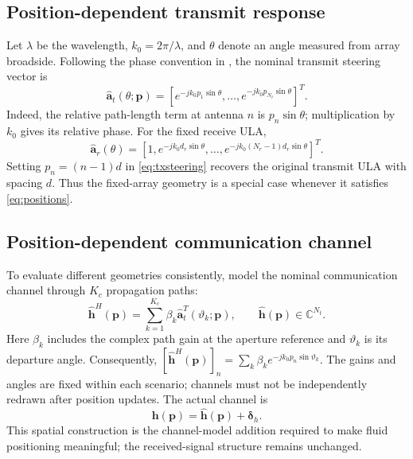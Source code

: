 \documentclass[11pt]{article}
\newcommand{\pos}{\mathbf p}
\begin{document}
\subsection{Position-dependent transmit response}
Let $\lambda$ be the wavelength, $k_0=2\pi/\lambda$, and $\theta$ denote an
angle measured from array broadside. Following the phase convention in
\cite{wang2026}, the nominal transmit steering vector is
\begin{equation}
 \widehat{\mathbf a}_t(\theta;\pos)
 =\left[e^{-jk_0p_1\sin\theta},\ldots,
 e^{-jk_0p_{N_t}\sin\theta}\right]^T.
 \label{eq:txsteering}
\end{equation}
Indeed, the relative path-length term at antenna $n$ is $p_n\sin\theta$;
multiplication by $k_0$ gives its relative phase. For the fixed receive ULA,
\begin{equation}
 \widehat{\mathbf a}_r(\theta)
 =\left[1,e^{-jk_0d_r\sin\theta},\ldots,
 e^{-jk_0(N_r-1)d_r\sin\theta}\right]^T.
 \label{eq:rxsteering}
\end{equation}
Setting $p_n=(n-1)d$ in \eqref{eq:txsteering} recovers the original transmit
ULA with spacing $d$. Thus the fixed-array geometry is a special case whenever
it satisfies \eqref{eq:positions}.

\subsection{Position-dependent communication channel}
To evaluate different geometries consistently, model the nominal communication
channel through $K_c$ propagation paths:
\begin{equation}
 \widehat{\mathbf h}^{H}(\pos)
 =\sum_{k=1}^{K_c}\beta_k
 \widehat{\mathbf a}_t^T(\vartheta_k;\pos),
 \qquad \widehat{\mathbf h}(\pos)\in\mathbb C^{N_t}.
 \label{eq:commchannel}
\end{equation}
Here $\beta_k$ includes the complex path gain at the aperture reference and
$\vartheta_k$ is its departure angle. Consequently,
$[\widehat{\mathbf h}^{H}(\pos)]_n=
\sum_k\beta_ke^{-jk_0p_n\sin\vartheta_k}$.
The gains and angles are fixed within each scenario; channels must not be
independently redrawn after position updates. The actual channel is
\begin{equation}
 \mathbf h(\pos)=\widehat{\mathbf h}(\pos)+\bm\delta_h.
 \label{eq:herror}
\end{equation}
This spatial construction is the channel-model addition required to make
fluid positioning meaningful; the received-signal structure remains unchanged.
\end{document}
